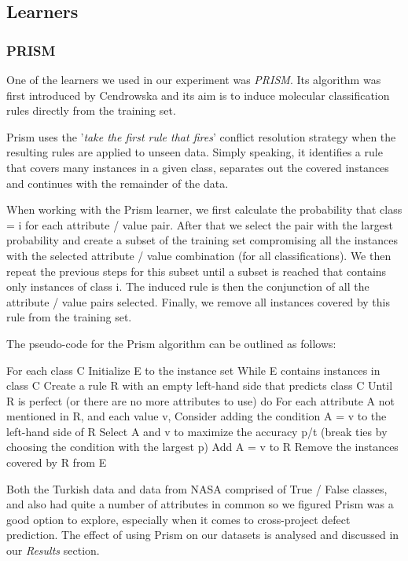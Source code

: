 \documentclass{sig-alternate}
\begin{document}
\subsection{Learners}
\subsubsection{PRISM}
One of the learners we used in our experiment was {\em PRISM}. Its algorithm was first introduced by Cendrowska and its aim is to induce molecular classification rules directly from the training set. 

Prism uses the '{\em take the first rule that fires}' conflict resolution strategy when the resulting rules are applied to unseen data. Simply speaking, it identifies a rule that covers many instances in a given class, separates out the covered instances and continues with the remainder of the data.

When working with the Prism learner, we first calculate the probability that class = i for each attribute / value pair. After that we select the pair with the largest probability and create a subset of the training set compromising all the instances with the selected attribute / value combination (for all classifications). We then repeat the previous steps for this subset until a subset is reached that contains only instances of class i. The induced rule is then the conjunction of all the attribute / value pairs selected. Finally, we remove all instances covered by this rule from the training set.


The pseudo-code for the Prism algorithm can be outlined as follows:

For each class C
 Initialize E to the instance set
 While E contains instances in class C
    Create a rule R with an empty left-hand side that predicts class C
    Until R is perfect (or there are no more attributes to use) do
       For each attribute A not mentioned in R, and each value v,
              Consider adding the condition A = v to the left-hand side of R
              Select A and v to maximize the accuracy p/t
               (break ties by choosing the condition with the largest p)
       Add A = v to R
    Remove the instances covered by R from E 

Both the Turkish data and data from NASA comprised of True / False classes, and also had quite a number of attributes in common so we figured Prism was a good option to explore, especially when it comes to cross-project defect prediction. The effect of using Prism on our datasets is analysed and discussed in our {\em Results} section.
\end{document}
